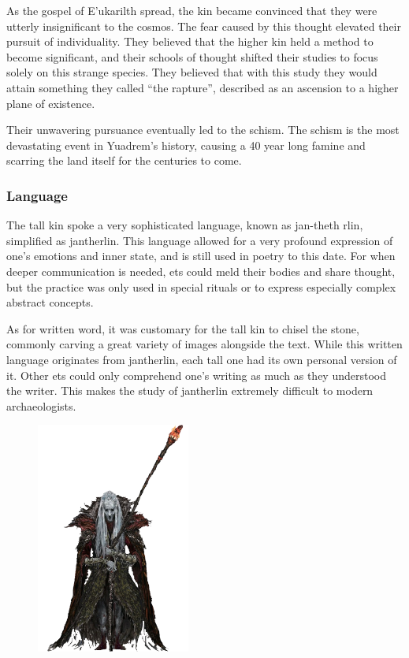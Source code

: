 \begin{linenumbers}
As the gospel of E'ukarilth spread, the kin became convinced that they were utterly insignificant to the cosmos.
The fear caused by this thought elevated their pursuit of individuality.
They believed that the higher kin held a method to become significant, and their schools of thought shifted their studies to focus solely on this strange species.
They believed that with this study they would attain something they called ``the rapture'', described as an ascension to a higher plane of existence.

Their unwavering pursuance eventually led to the schism.
The schism is the most devastating event in Yuadrem's history, causing a 40 year long famine and scarring the land itself for the centuries to come.

\subsubsection{Language}
The tall kin spoke a very sophisticated language, known as jan-theth rlin, simplified as jantherlin.
This language allowed for a very profound expression of one's emotions and inner state, and is still used in poetry to this date.
For when deeper communication is needed, ets could meld their bodies and share thought, but the practice was only used in special rituals or to express especially complex abstract concepts.

As for written word, it was customary for the tall kin to chisel the stone, commonly carving a great variety of images alongside the text.
While this written language originates from jantherlin, each tall one had its own personal version of it.
Other ets could only comprehend one's writing as much as they understood the writer.
This makes the study of jantherlin extremely difficult to modern archaeologists.

\begin{figure}[t]
    \centering
    \includegraphics[width=0.45\textwidth]{03kins/img/10et_cleric.png}
\end{figure}


\end{linenumbers}
